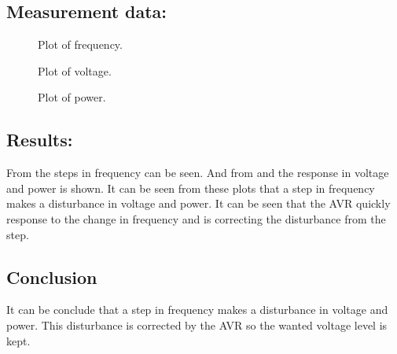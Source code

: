 \subsection*{Measurement data:}

\begin{figure}[H]
\centering

\caption{Plot of frequency.}
\label{fig:test1-6freq}
\end{figure}

\begin{figure}[H]
\centering

\caption{Plot of voltage.}
\label{fig:test1-6fvolt}
\end{figure}

\begin{figure}[H]
\centering

\caption{Plot of power.}
\label{fig:test1-6fpower}
\end{figure}


\subsection*{Results:}
From  the steps in frequency can be seen. And from  and  the response in voltage and power is shown. It can be seen from these plots that a step in frequency makes a disturbance in voltage and power. It can be seen that the AVR quickly response to the change in frequency and is correcting the disturbance from the step.  


\subsection*{Conclusion}
It can be conclude that a step in frequency makes a disturbance in voltage and power. This disturbance is corrected by the AVR so the wanted voltage level is kept. 